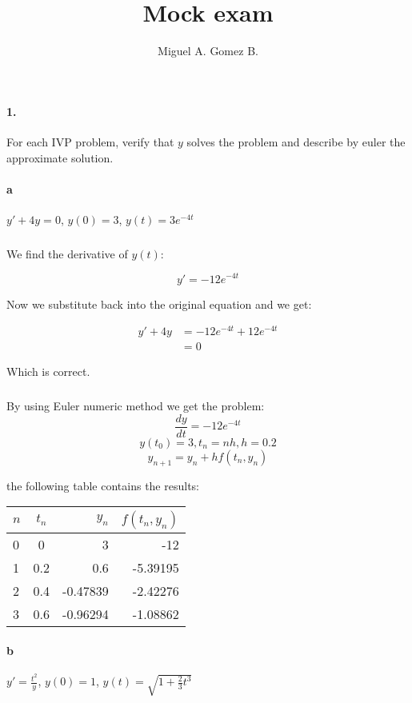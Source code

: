 \documentclass{article}
\title{Mock exam}
\author{Miguel A. Gomez B.}
\begin{document}
\maketitle

\paragraph{1.} For each IVP problem, verify that $y$ solves the problem and describe by euler the approximate solution.

\paragraph{a} $y'+ 4y =0$, $y(0)=3$, $y(t) = 3e^{-4t}$

\subparagraph{} We find the derivative of $y(t)$:

\[
    y' = -12e^{-4t}
\]

Now we substitute back into the original equation and we get:

\begin{align*}
    y'+ 4y &= -12e^{-4t} + 12e^{-4t}\\
    &= 0
\end{align*}

Which is correct.

\subparagraph{} By using Euler numeric method we get the problem:
\[
    \frac{dy}{dt} = -12e^{-4t}
\]
\[
    y(t_0) = 3, t_n = nh, h = 0.2
\]
\[
    y_{n+1} = y_n + hf(t_n,y_n)
\]

the following table contains the results:

\begin{table}[ht]
  \begin{center}
    \label{tab:1.a}
    \begin{tabular}{l|c|r|r} %
      $n$&$t_n$&$y_n$&$f(t_n,y_n)$\\
      \hline
        0&0&3&-12\\
        1&0.2&0.6&-5.39195\\
        2&0.4&-0.47839&-2.42276\\
        3&0.6&-0.96294&-1.08862\\
    \end{tabular}
  \end{center}
\end{table}

\newpage

\paragraph{b} $y' = \frac{t^{2}}{y}$, $y(0)=1$, $y(t) = \sqrt{1 + \frac{2}{3}t^{3}}$
\end{document}
